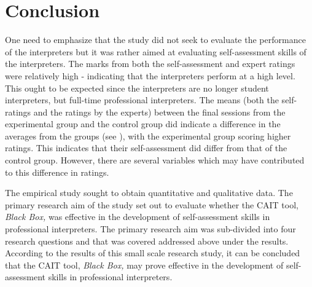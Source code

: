 \documentclass[output=paper]{langsci/langscibook}
\begin{document}
\section{Conclusion}

One need to emphasize that the study did not seek to evaluate the performance of the interpreters but it was rather aimed at evaluating self-assessment skills of the interpreters. The marks from both the self-assessment and expert ratings were relatively high -  indicating that the interpreters perform at a high level. This ought to be expected since the interpreters are no longer student interpreters, but full-time professional interpreters. The means (both the self-ratings and the ratings by the experts) between the final sessions from the experimental group and the control group did indicate a difference in the averages from the groups (see ), with the experimental group scoring higher ratings. This indicates that their self-assessment did differ from that of the control group. However, there are several variables which may have contributed to this difference in ratings.  

The empirical study sought to obtain quantitative and qualitative data. The primary research aim of the study set out to evaluate whether the \textsc{CAIT} tool, \textit{Black Box,} was effective in the development of self-assessment skills in professional interpreters. The primary research aim was sub-divided into four research questions and that was covered addressed above under the results. According to the results of this small scale research study, it can be concluded that the \textsc{CAIT} tool, \textit{Black Box,} may prove effective in the development of self-assessment skills in professional interpreters. 
\end{document}

